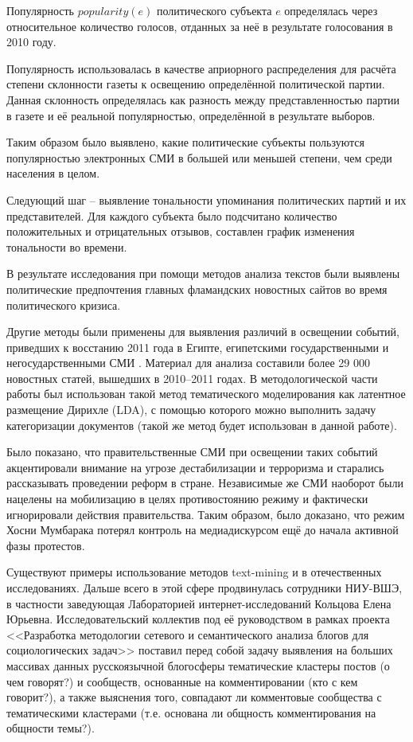 Популярность $popularity(e)$ политического субъекта $e$ определялась через относительное количество голосов, отданных за неё в результате голосования в 2010 году.

Популярность использовалась в качестве априорного распределения для расчёта степени склонности газеты к освещению определённой политической партии. Данная склонность определялась как разность между представленностью партии в газете и её реальной популярностью, определённой в результате выборов.

Таким образом было выявлено, какие политические субъекты пользуются популярностью электронных СМИ в большей или меньшей степени, чем среди населения в целом.

Следующий шаг -- выявление тональности упоминания политических партий и их представителей. Для каждого субъекта было подсчитано количество положительных и отрицательных отзывов, составлен график изменения тональности во времени.

В результате исследования при помощи методов анализа текстов были выявлены политические предпочтения главных фламандских новостных сайтов во время политического кризиса.

Другие методы были применены для выявления различий в освещении событий, приведших к восстанию 2011 года в Египте, египетскими государственными и негосударственными СМИ \cite{EgyptianUprising2012}. Материал для анализа составили более 29 000 новостных статей, вышедших в 2010--2011 годах. В методологической части работы был использован такой метод тематического моделирования как латентное размещение Дирихле (LDA), с помощью которого можно выполнить задачу категоризации документов (такой же метод будет использован в данной работе).

Было показано, что правительственные СМИ при освещении таких событий акцентировали внимание на угрозе дестабилизации и терроризма и старались рассказывать проведении реформ в стране. Независимые же СМИ наоборот были нацелены на мобилизацию в целях противостоянию режиму и фактически игнорировали действия правительства. Таким образом, было доказано, что режим Хосни Мумбарака потерял контроль на медиадискурсом ещё до начала активной фазы протестов.

Существуют примеры использование методов text-mining и в отечественных исследованиях. Дальше всего в этой сфере продвинулась сотрудники НИУ-ВШЭ, в частности заведующая Лабораторией интернет-исследований Кольцова Елена Юрьевна. Исследовательский коллектив под её руководством в рамках проекта <<Разработка методологии сетевого и семантического анализа блогов для социологических задач>> поставил перед собой задачу выявления на больших массивах данных русскоязычной блогосферы тематические кластеры постов (о чем говорят?) и сообществ, основанные на комментировании (кто с кем говорит?), а также выяснения того, совпадают ли комментовые сообщества с тематическими кластерами (т.е. основана ли общность комментирования на общности темы?).

